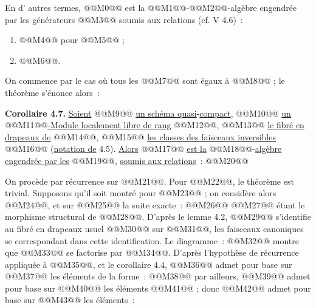 
En d'%
autres termes, @@M0@@ est la @@M1@@-@@M2@@-algèbre engendrée par les générateurs @@M3@@ soumis aux relations (cf. V 4.6)~:
\begin{enumerate}[label=\textup{\roman*)}]
\item @@M4@@ pour @@M5@@ ;
\item @@M6@@.
\end{enumerate}

On commence par le cas où tous les @@M7@@ sont égaux à @@M8@@ ; le théorème s'énonce alors~:

\textbf{Corollaire 4.7.} \uline{Soient} @@M9@@ \uline{un schéma quasi}-\uline{compact}, @@M10@@ \uline{un} @@M11@@\uline{-Module localement libre de rang} @@M12@@, @@M13@@ \uline{le fibré en drapeaux de} @@M14@@, @@M15@@ \uline{les classes des faisceaux inversibles} @@M16@@ (\uline{notation de} 4.5). \uline{Alors} @@M17@@ \uline{est la} @@M18@@-\uline{algèbre engendrée par les} @@M19@@, \uline{soumis aux relations}~:
@@M20@@

On procède par récurrence sur @@M21@@. Pour @@M22@@, le théorème est trivial. Supposons qu'il soit montré pour @@M23@@ ; on considère alors @@M24@@, et sur @@M25@@ la suite exacte~:
@@M26@@
@@M27@@ étant le morphisme structural de @@M28@@. D'après le lemme 4.2, @@M29@@ s'identifie au fibré en drapeaux usuel @@M30@@ sur @@M31@@, les faisceaux canoniques se correspondant dans cette identification. Le diagramme~:
@@M32@@
montre que @@M33@@ se factorise par @@M34@@. D'après l'hypothèse de récurrence appliquée à @@M35@@, et le corollaire 4.4, @@M36@@ admet pour base sur @@M37@@ les éléments de la forme~:
@@M38@@
par ailleurs, @@M39@@ admet pour base sur @@M40@@ les éléments @@M41@@ ; donc @@M42@@ admet pour base sur @@M43@@ les éléments~:
